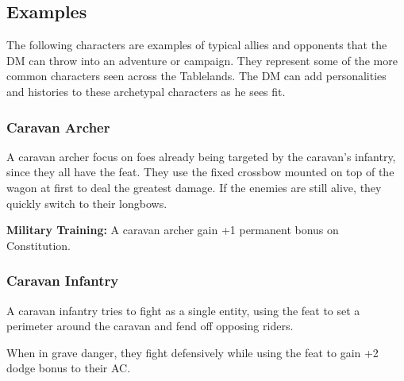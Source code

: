 \subsection{Examples}
The following characters are examples of typical allies and opponents that the DM can throw into an adventure or campaign. They represent some of the more common characters seen across the Tablelands. The DM can add personalities and histories to these archetypal characters as he sees fit.

\subsubsection{Caravan Archer}

A caravan archer focus on foes already being targeted by the caravan's infantry, since they all have the  feat. They use the fixed crossbow mounted on top of the wagon at first to deal the greatest damage. If the enemies are still alive, they quickly switch to their longbows.

\textbf{Military Training:} A caravan archer gain +1 permanent bonus on Constitution.

\subsubsection{Caravan Infantry}

A caravan infantry tries to fight as a single entity, using the  feat to set a perimeter around the caravan and fend off opposing riders.

When in grave danger, they fight defensively while using the  feat to gain +2 dodge bonus to their AC.

